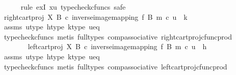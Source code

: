 \begin{isabellebody}
\ \ \ \ \isamarkupfalse%
\ {\isacharparenleft}{\kern0pt}rule\ exI{\isacharbrackleft}{\kern0pt}\ x{\isacharequal}{\kern0pt}u{\isacharbrackright}{\kern0pt}{\isacharcomma}{\kern0pt}\ typecheck{\isacharunderscore}{\kern0pt}cfuncs{\isacharcomma}{\kern0pt}\ safe{\isacharparenright}{\kern0pt}\isanewline
\isanewline
\ \ \ \ \ \ \isamarkupfalse%
\ {\isachardoublequoteopen}{\isacharparenleft}{\kern0pt}right{\isacharunderscore}{\kern0pt}cart{\isacharunderscore}{\kern0pt}proj\ X\ B\ {\isasymcirc}\isactrlsub c\ inverse{\isacharunderscore}{\kern0pt}image{\isacharunderscore}{\kern0pt}mapping\ f\ B\ m{\isacharparenright}{\kern0pt}\ {\isasymcirc}\isactrlsub c\ u\ {\isacharequal}{\kern0pt}\ k{\isachardoublequoteclose}\isanewline
\ \ \ \ \ \ \ \ \isamarkupfalse%
\ assms\ u{\isacharunderscore}{\kern0pt}type\ h{\isacharunderscore}{\kern0pt}type\ k{\isacharunderscore}{\kern0pt}type\ u{\isacharunderscore}{\kern0pt}eq\isanewline
\ \ \ \ \ \ \ \ \isamarkupfalse%
\ {\isacharparenleft}{\kern0pt}typecheck{\isacharunderscore}{\kern0pt}cfuncs{\isacharcomma}{\kern0pt}\ metis\ {\isacharparenleft}{\kern0pt}full{\isacharunderscore}{\kern0pt}types{\isacharparenright}{\kern0pt}\ comp{\isacharunderscore}{\kern0pt}associative{}\ right{\isacharunderscore}{\kern0pt}cart{\isacharunderscore}{\kern0pt}proj{\isacharunderscore}{\kern0pt}cfunc{\isacharunderscore}{\kern0pt}prod{\isacharparenright}{\kern0pt}\isanewline
\ \ \isanewline
\ \ \ \ \ \ \isamarkupfalse%
\ {\isachardoublequoteopen}{\isacharparenleft}{\kern0pt}left{\isacharunderscore}{\kern0pt}cart{\isacharunderscore}{\kern0pt}proj\ X\ B\ {\isasymcirc}\isactrlsub c\ inverse{\isacharunderscore}{\kern0pt}image{\isacharunderscore}{\kern0pt}mapping\ f\ B\ m{\isacharparenright}{\kern0pt}\ {\isasymcirc}\isactrlsub c\ u\ {\isacharequal}{\kern0pt}\ h{\isachardoublequoteclose}\isanewline
\ \ \ \ \ \ \ \ \isamarkupfalse%
\ assms\ u{\isacharunderscore}{\kern0pt}type\ h{\isacharunderscore}{\kern0pt}type\ k{\isacharunderscore}{\kern0pt}type\ u{\isacharunderscore}{\kern0pt}eq\isanewline
\ \ \ \ \ \ \ \ \isamarkupfalse%
\ {\isacharparenleft}{\kern0pt}typecheck{\isacharunderscore}{\kern0pt}cfuncs{\isacharcomma}{\kern0pt}\ metis\ {\isacharparenleft}{\kern0pt}full{\isacharunderscore}{\kern0pt}types{\isacharparenright}{\kern0pt}\ comp{\isacharunderscore}{\kern0pt}associative{}\ left{\isacharunderscore}{\kern0pt}cart{\isacharunderscore}{\kern0pt}proj{\isacharunderscore}{\kern0pt}cfunc{\isacharunderscore}{\kern0pt}prod{\isacharparenright}{\kern0pt}\isanewline

\end{isabellebody}
